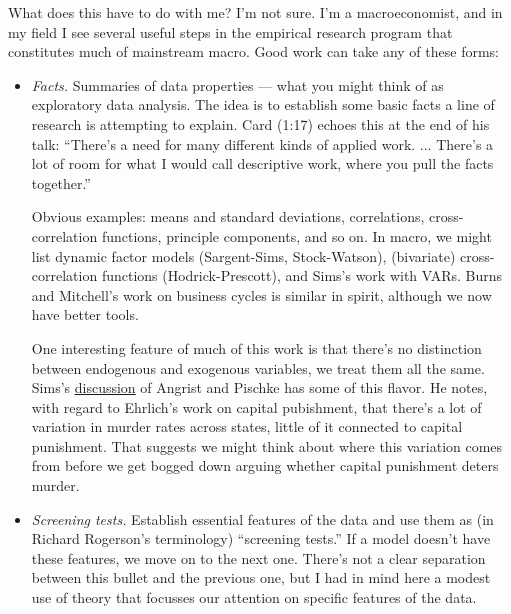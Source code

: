\documentclass[11pt,letterpaper]{article}
\begin{document}
What does this have to do with me?
I'm not sure.
I'm a macroeconomist, and in my field I see several useful
steps in the empirical research program that constitutes much
of mainstream macro.
Good work can take any of these forms:
%
\begin{itemize}
\item {\it Facts.\/}
Summaries of data properties ---
what you might think of as exploratory data analysis.
The idea is to establish some basic facts a line of research is attempting
to explain.
Card (1:17) echoes this at the end of his talk:
``There's a need for many different kinds of applied work.
... There's a lot of room for what I would call descriptive work,
where you pull the facts together.''

Obvious examples:  means and standard deviations,
correlations, cross-correlation functions, principle components, and so on.
In macro, we might list dynamic factor models (Sargent-Sims, Stock-Watson),
(bivariate) cross-correlation functions (Hodrick-Prescott),
and Sims's work with VARs.
Burns and Mitchell's work on business cycles is similar in spirit,
although we now have better tools.

One interesting feature of much of this work is that
there's no distinction between endogenous and exogenous variables,
we treat them all the same.
Sims's
\href{http://www.jstor.org/stable/25703499}{discussion}
of Angrist and Pischke has some of this flavor.
He notes, with regard to Ehrlich's work on capital pubishment,
that there's a lot of variation in murder rates across states,
little of it connected to capital punishment.
That suggests we might think about where this variation comes from
before we get bogged down arguing whether capital punishment deters murder.

\item {\it Screening tests.\/}  Establish essential features of the data
 and use them as (in Richard Rogerson's terminology) ``screening tests.''
 If a model doesn't have these features, we move on to the next one.
 There's not a clear separation between this bullet and the previous one,
but I had in mind here a modest use of theory that focusses
our attention on specific features of the data.


\end{itemize}
\end{document}
